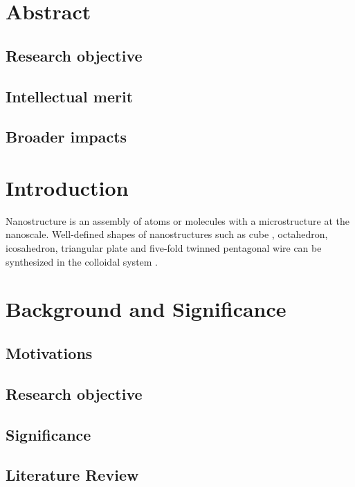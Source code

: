 \section{Abstract}

\subsection{Research objective}

\subsection{Intellectual merit}

\subsection{Broader impacts}



\section{Introduction}

Nanostructure is an assembly of atoms or molecules with a microstructure at the nanoscale. Well-defined shapes of nanostructures such as cube , octahedron, icosahedron, triangular plate and five-fold twinned pentagonal wire can be synthesized in the colloidal system .


\section{Background and Significance}

\subsection{Motivations}

\subsection{Research objective}

\subsection{Significance}

\subsection{Literature Review}


